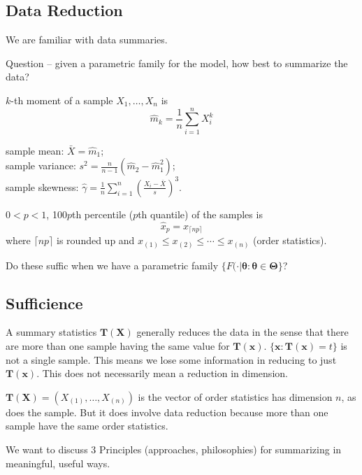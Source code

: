 \documentclass[english, 11pt]{article}
\begin{document}
\subsection{Data Reduction}

We are familiar with data summaries.

Question -- given a parametric family for the model, how best to summarize the data?

\begin{defn}
$k$-th moment of a sample $X_1, \dots, X_n$ is
$$
\hat{m}_k=\frac{1}{n}\sum_{i=1}^nX^k_i
$$
\end{defn}

sample mean: $\bar{X}=\hat{m}_1$;\\
sample variance: $s^2=\frac{n}{n-1}(\hat{m}_2-\hat{m}_1^2)$;\\
sample skewness: $\hat{\gamma}=\frac{1}{n}\sum_{i=1}^n\left(\frac{X_i-\bar{X}}{s}\right)^3$.

\begin{defn}[Percentiles] $0<p<1$, 100$p$th percentile ($p$th quantile) of the samples is
$$
\hat{x}_p=x_{\lceil np\rceil}
$$
where $\lceil np\rceil$ is rounded up and $x_{(1)}\leqslant x_{(2)}\leqslant \cdots\leqslant x_{(n)}$ (order statistics).
\end{defn}

Do these suffic when we have a parametric family $\{F(\cdot|\bm{\theta}:\bm{\theta}\in \bm{\Theta}\}$?

\subsection{Sufficience}

A summary statistics $\bm{T}(\bm{X})$ generally reduces the data in the sense that there are more than one sample having the same value for $\bm{T}(\bm{x})$. $\{\bm{x}:\bm{T}(\bm{x})=t\}$ is not a single sample. This means we lose some information in reducing  to just $\bm{T}(\bm{x})$. This does not necessarily mean a reduction in dimension.

\begin{exmp}
$\bm{T}(\bm{X})=(X_{(1)}, \dots ,X_{(n)})$ is the vector of order statistics has dimension $n$, as does the sample. But it does involve data reduction because more than one sample have the same order statistics.
\end{exmp}

We want to discuss 3 Principles (approaches, philosophies) for summarizing in meaningful, useful ways.
\end{document}
